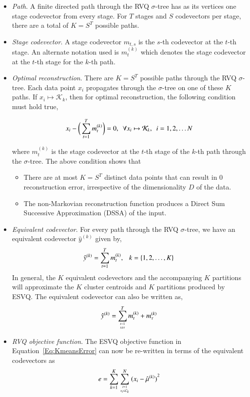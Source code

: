 \begin{Body}
\begin{itemize}
\item \emph{Path}.  A finite directed path through the RVQ $\sigma$-tree has as its vertices one stage codevector from every stage.  For $T$ stages and $S$ codevectors per stage, there are a total of $K = S^T$ possible paths.
\item \emph{Stage codevector}.  A stage codevector $m_{t, s}$ is the $s$-th codevector at the $t$-th stage.  An alternate notation used is $m^{(k)}_t$ which denotes the stage codevector at the $t$-th stage for the $k$-th path.
\item \emph{Optimal reconstruction}.  There are $K=S^T$ possible paths through the RVQ $\sigma$-tree.  Each data point $x_i$ propagates through the $\sigma$-tree on one of these $K$ paths.  If $x_i \mapsto \mathcal{K}_k$, then for optimal reconstruction, the following condition must hold true,

\begin{equation*}
x_i -\bigg(\sum_{t=1}^Tm^{(k)}_t\bigg) = 0, \ \ \forall x_i \mapsto \mathcal{K}_k, \ \ i =1, 2, \ldots N\\
\end{equation*}

where $m^{(k)}_t$ is the stage codevector at the $t$-th stage of the $k$-th path through the $\sigma$-tree.  The above condition shows that

\begin{itemize} 
\item There are at most $K=S^T$ distinct data points that can result in 0 reconstruction error, irrespective of the dimensionality $D$ of the data. 
\item The non-Markovian reconstruction function produces a Direct Sum Successive Approximation (DSSA) of the input.
\end{itemize}\item \emph{Equivalent codevector}.  For every path through the RVQ $\sigma$-tree, we have an equivalent codevector $\hat{y}^{(k)}$ given by,
\begin{equation}
\hat{y}^{(k)} = \sum_{t=1 }^Tm^{(k)}_t, \ \ \ k=\{1, 2, \ldots, K\}
\end{equation}
In general, the $K$ equivalent codevectors and the accompanying $K$ partitions will approximate the $K$ cluster centroids and $K$ partitions produced by ESVQ.  The equivalent codevector can also be written as,
\begin{equation}
\label{Eq:RVQequivalentCodevectorBroken}
\hat{y}^{(k)} = \sum_{t=1 \atop t \neq \tau}^Tm^{(k)}_t+ m^{(k)}_\tau
\end{equation}
\item \emph{RVQ objective function}.  The ESVQ objective function in Equation~\ref{Eq:KmeansError} can now be re-written in terms of the equivalent codevectors as 
\begin{equation}
e = \sum\limits_{k=1}^K \sum\limits_{{i=1 \atop x_i \in \mathcal{C}_k}}^N {(x_i - \hat{\mu}^{(k)})}^2
\end{equation}
\end{itemize}


\end{Body}

